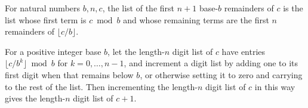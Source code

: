 \begin{theorem}
\label{Light.digitsLE_succ}
\leanok
{}
For natural numbers $b,n,c$, the list of the first $n+1$ base-$b$ remainders of $c$ is
the list whose first term is $c\bmod b$ and whose remaining terms are the first $n$
remainders of $\lfloor c/b\rfloor$.
\end{theorem}

\begin{theorem}
\label{Light.incDigits_digitsLE}
\leanok
{}
For a positive integer base $b$, let the length-$n$ digit list of $c$ have entries
$\lfloor c/b^k\rfloor \bmod b$ for $k=0,\ldots,n-1$, and increment a digit list by
adding one to its first digit when that remains below $b$, or otherwise setting it to
zero and carrying to the rest of the list. Then incrementing the length-$n$ digit list
of $c$ in this way gives the length-$n$ digit list of $c+1$.
\end{theorem}
